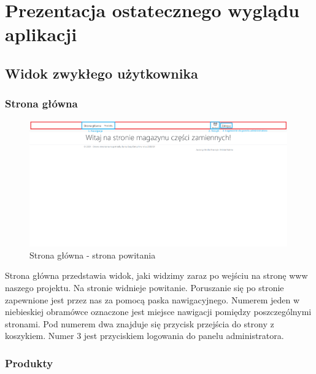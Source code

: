 \documentclass{article}
\begin{document}
\section{Prezentacja ostatecznego wyglądu aplikacji}
\subsection{Widok zwykłego użytkownika}

\subsubsection{Strona główna}
\begin{figure}[H]
   \centering
   \includegraphics[width=0.99\textwidth,frame]{Wyglad/powitanie_uzytkownik.png}
   \caption{Strona główna - strona powitania}
\end{figure}
Strona główna przedstawia widok, jaki widzimy zaraz po wejściu na stronę www naszego projektu. 
Na stronie widnieje powitanie. Poruszanie się po stronie zapewnione jest przez nas za pomocą paska
nawigacyjnego. Numerem jeden w niebieskiej obramówce oznaczone jest miejsce nawigacji pomiędzy
poszczególnymi stronami. Pod numerem dwa znajduje się przycisk przejścia do strony z koszykiem.
Numer 3 jest przyciskiem logowania do panelu administratora.
\subsubsection{Produkty}
\end{document}
